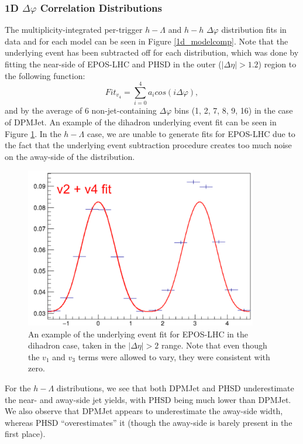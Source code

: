 \documentclass[ALICE,manyauthors]{ALICE_analysis_notes}
\begin{document}
\subsubsection{1D $\Delta\varphi$ Correlation Distributions}
\label{model_1d_correlations}

The multiplicity-integrated per-trigger $h-\Lambda$ and $h-h$ $\Delta\varphi$ distribution fits in data and for each model can be seen in Figure \ref{1d_modelcomp}. Note that the underlying event has been subtracted off for each distribution, which was done by fitting the near-side of EPOS-LHC and PHSD in the outer ($|\Delta\eta| > 1.2$) region to the following function:
\begin{equation}
Fit_{v_{4}} = \sum_{i=0}^{4} a_{i}cos(i\Delta\varphi),
\end{equation}
and by the average of 6 non-jet-containing $\Delta\varphi$ bins (1, 2, 7, 8, 9, 16) in the case of DPMJet. An example of the dihadron underlying event fit can be seen in Figure \ref{epos_ue_fit}. In the $h-\Lambda$ case, we are unable to generate fits for EPOS-LHC due to the fact that the underlying event subtraction procedure creates too much noise on the away-side of the distribution.

\begin{figure}[ht]
\centering
\includegraphics[width=4in]{figures/epos_ue_fit.png}
\caption{An example of the underlying event fit for EPOS-LHC in the dihadron case, taken in the $|\Delta\eta| > 2$ range. Note that even though the $v_1$ and $v_3$ terms were allowed to vary, they were consistent with zero.}
\label{epos_ue_fit}
\end{figure}

For the $h-\Lambda$ distributions, we see that both DPMJet and PHSD underestimate the near- and away-side jet yields, with PHSD being much lower than DPMJet. We also observe that DPMJet appears to underestimate the away-side width, whereas PHSD ``overestimates'' it (though the away-side is barely present in the first place).
\end{document}

